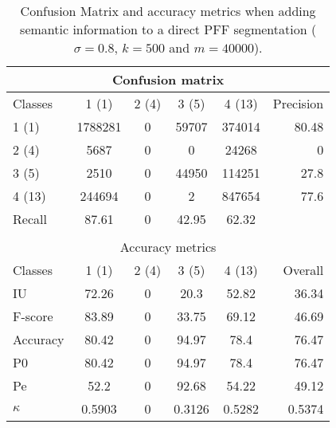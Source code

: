 \begin{table}[H]
\begin{center}
\begin{tabular}{|l|c|c|c|c|r|}
\hline
\multicolumn{6}{|c|}{Confusion matrix} \\
\hline
 Classes & 1 (1) & 2 (4) & 3 (5) & 4 (13) & Precision \\
\hline
1 (1) & 1788281 & 0 & 59707 & 374014 & 80.48 \\
\hline
2 (4) & 5687 & 0 & 0 & 24268 & 0 \\
\hline
3 (5) & 2510 & 0 & 44950 & 114251 & 27.8 \\
\hline
4 (13) & 244694 & 0 & 2 & 847654 & 77.6 \\
\hline
Recall & 87.61 & 0 & 42.95 & 62.32 &  \\
\hline
\multicolumn{6}{c}{ } \\
\hline
\multicolumn{6}{|c|}{Accuracy metrics} \\
\hline
 Classes & 1 (1) & 2 (4) & 3 (5) & 4 (13) & Overall \\
\hline
IU & 72.26 & 0 & 20.3 & 52.82 & 36.34 \\
\hline
F-score & 83.89 & 0 & 33.75 & 69.12 & 46.69 \\
\hline
Accuracy & 80.42 & 0 & 94.97 & 78.4 & 76.47 \\
\hline
P0 & 80.42 & 0 & 94.97 & 78.4 & 76.47 \\
\hline
Pe & 52.2 & 0 & 92.68 & 54.22 & 49.12 \\
\hline
$\kappa$ & 0.5903 & 0 & 0.3126 & 0.5282 & 0.5374 \\
\hline
\end{tabular}
\caption{Confusion Matrix and accuracy metrics when adding semantic information to a direct PFF segmentation ($\sigma=0.8$, $k=500$ and $m=40000$).}
\label{table:C3_S2_seg_PFF_z}
\end{center}
\end{table}